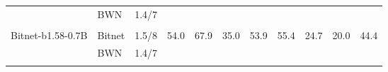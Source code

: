 \begin{table}[htbp]
{\begin{tabular}{l l c r r r r r r r r}
  & BWN           & 1.4/7   \\
  & \cellcolor[HTML]{F9D7EF}{BWTA (Ours)} & \cellcolor[HTML]{F9D7EF}{1.4/7} &
    \cellcolor[HTML]{F9D7EF}{56.9} & \cellcolor[HTML]{F9D7EF}{68.3} &
    \cellcolor[HTML]{F9D7EF}{36.9} & \cellcolor[HTML]{F9D7EF}{55.3} &
    \cellcolor[HTML]{F9D7EF}{57.3} & \cellcolor[HTML]{F9D7EF}{26.5} &
    \cellcolor[HTML]{F9D7EF}{21.6} & \cellcolor[HTML]{F9D7EF}{46.1} \\
\midrule
\multirow{2}{*}{Bitnet-b1.58-0.7B}
  & Bitnet        & 1.5/8   & 54.0 & 67.9 & 35.0 & 53.9 & 55.4 & 24.7 & 20.0 & 44.4 \\
  & BWN           & 1.4/7   \\
  & \cellcolor[HTML]{F9D7EF}{BWTA (Ours)} & \cellcolor[HTML]{F9D7EF}{1.4/7} &
    \cellcolor[HTML]{F9D7EF}{58.9} & \cellcolor[HTML]{F9D7EF}{65.1} &
    \cellcolor[HTML]{F9D7EF}{33.4} & \cellcolor[HTML]{F9D7EF}{53.8} &
    \cellcolor[HTML]{F9D7EF}{51.7} & \cellcolor[HTML]{F9D7EF}{23.6} &
    \cellcolor[HTML]{F9D7EF}{21.6} & \cellcolor[HTML]{F9D7EF}{44.0} \\
\bottomrule
\end{tabular}}
\end{table}
